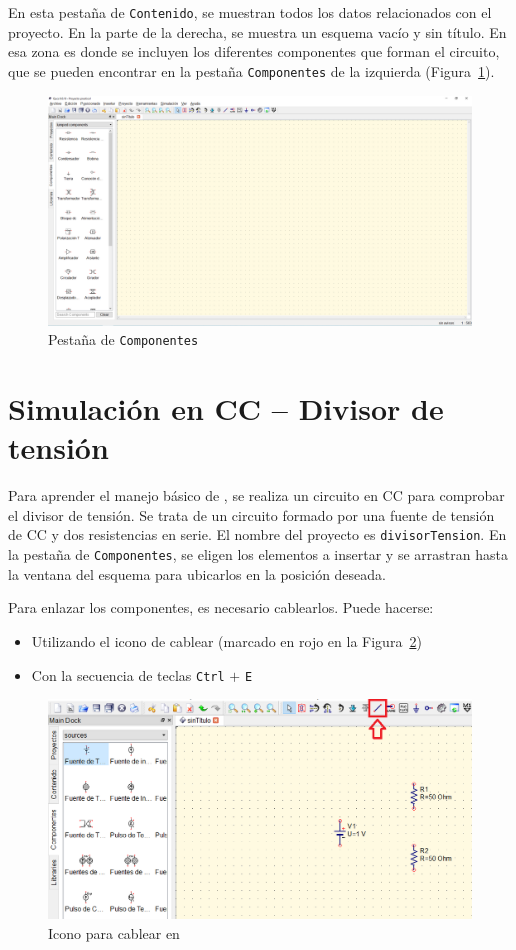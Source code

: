 \documentclass[a4paper,10pt]{article} %
\begin{document}
En esta pestaña de \texttt{Contenido}, se muestran todos los datos relacionados con el proyecto. En la parte de la derecha, se muestra un esquema vacío y sin título. En esa zona es donde se incluyen los diferentes componentes que forman el circuito, que se pueden encontrar en la pestaña \texttt{Componentes} de la izquierda (Figura~\ref{fig.qucs4}).
\begin{figure}[htbp]
    \centering
    \includegraphics[width=\linewidth]{../figs/qucs4.PNG}
    \caption{Pestaña de \texttt{Componentes}}
    \label{fig.qucs4}
\end{figure}

\section{Simulación en CC -- Divisor de tensión}

Para aprender el manejo básico de \qucs, se realiza un circuito en CC para comprobar el divisor de tensión. Se trata de un circuito formado por una fuente de tensión de CC y dos resistencias en serie. El nombre del proyecto es \texttt{divisorTension}. En la pestaña de \texttt{Componentes}, se eligen los elementos a insertar y se arrastran hasta la ventana del esquema para ubicarlos en la posición deseada. 

Para enlazar los componentes, es necesario cablearlos. Puede hacerse:
\begin{itemize}
    \item Utilizando el icono de cablear (marcado en rojo en la Figura~\ref{fig.qucs5})
    \item Con la secuencia de teclas \texttt{Ctrl} $+$ \texttt{E}
\end{itemize}
    \begin{figure}[htbp]
        \centering
        \includegraphics[width=0.7\linewidth]{../figs/qucs5.png}
        \caption{Icono para cablear en \qucs}
        \label{fig.qucs5}
    \end{figure}
\end{document}
